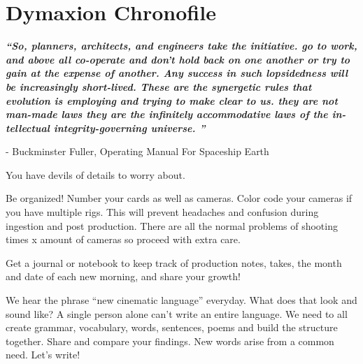 \chapter{Dymaxion Chronofile}
\pagecolor{white}
\label{chap:29}
\begin{fullwidth}


{\itshape\bfseries “So, planners, architects, and engineers take the initiative. go to work, and above all co-operate and don’t hold back on one another or try to gain at the expense of another. Any success in such lopsidedness will be increasingly short-lived. These are the synergetic rules that evolution is employing and trying to make clear to us. they are not man-made laws they are the infinitely accommodative laws of the in-tellectual integrity-governing universe. ”}

- Buckminster Fuller, Operating Manual For Spaceship Earth
\vspace{\baselineskip}

\problem

{\large You have devils of details to worry about. 
 \par}

Be organized! Number your cards as well as cameras. Color code your cameras if you have multiple rigs. This will prevent headaches and confusion during ingestion and post production. There are all the normal problems of shooting times x amount of cameras so proceed with extra care. 


\solution

{\large Get a journal or notebook to keep track of production notes, takes, the month and date of each new morning, and share your growth! 

 \par}

We hear the phrase “new cinematic language” everyday. What does that look and sound like? A single person alone can’t write an entire language. We need to all create grammar, vocabulary, words, sentences, poems and build the structure together. Share and compare your findings. New words arise from a common need.  Let’s write!




\clearpage
\end{fullwidth}
